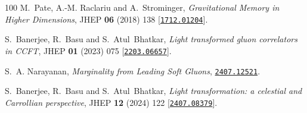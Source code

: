 \begin{thebibliography}{100}
M.~Pate, A.-M. Raclariu and A.~Strominger,  {\em {Gravitational Memory in
  Higher Dimensions}}, JHEP {\bf 06} (2018) 138
  [\href{http://www.arXiv.org/abs/1712.01204}{{\tt 1712.01204}}].

S.~Banerjee, R.~Basu and S.~Atul~Bhatkar,  {\em {Light transformed gluon
  correlators in CCFT}}, JHEP {\bf 01} (2023) 075
  [\href{http://www.arXiv.org/abs/2203.06657}{{\tt 2203.06657}}].

S.~A. Narayanan,  {\em {Marginality from Leading Soft Gluons}},
  \href{http://www.arXiv.org/abs/2407.12521}{{\tt 2407.12521}}.

S.~Banerjee, R.~Basu and S.~Atul~Bhatkar,  {\em {Light transformation: a
  celestial and Carrollian perspective}}, JHEP {\bf 12} (2024) 122
  [\href{http://www.arXiv.org/abs/2407.08379}{{\tt 2407.08379}}].

\end{thebibliography}\endgroup

